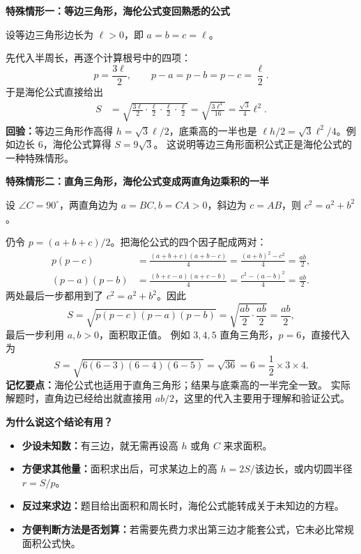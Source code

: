 \begin{explanationbox}
\medskip
\par\noindent\begin{minipage}{\linewidth}
\textbf{\textcolor{CExplanation}{特殊情形一：等边三角形，海伦公式变回熟悉的公式}}

设等边三角形边长为 $\ell>0$，即 $a=b=c=\ell$。
\end{minipage}\par
先代入半周长，再逐个计算根号中的四项：
\[
 p=\frac{3\ell}{2},\qquad
 p-a=p-b=p-c=\frac\ell2.
\]
于是海伦公式直接给出
\[
 \begin{aligned}
 S&=\sqrt{\frac{3\ell}{2}\cdot\frac\ell2\cdot\frac\ell2\cdot\frac\ell2}
   =\sqrt{\frac{3\ell^4}{16}}
   =\boxed{\frac{\sqrt3}{4}\ell^2}.
 \end{aligned}
\]
\textbf{回验：}等边三角形作高得 $h=\sqrt3\ell/2$，底乘高的一半也是
$\ell h/2=\sqrt3\ell^2/4$。例如边长 $6$，海伦公式算得 $S=9\sqrt3$。
这说明等边三角形面积公式正是海伦公式的一种特殊情形。

\medskip
\par\noindent\begin{minipage}{\linewidth}
\textbf{\textcolor{CExplanation}{特殊情形二：直角三角形，海伦公式变成两直角边乘积的一半}}

设 $\angle C=90^\circ$，两直角边为 $a=BC,b=CA>0$，斜边为 $c=AB$，则 $c^2=a^2+b^2$。
\end{minipage}\par
仍令 $p=(a+b+c)/2$。把海伦公式的四个因子配成两对：
\[
 \begin{aligned}
 p(p-c)&=\frac{(a+b+c)(a+b-c)}4
 =\frac{(a+b)^2-c^2}{4}=\frac{ab}{2},\\
 (p-a)(p-b)&=\frac{(b+c-a)(a+c-b)}4
 =\frac{c^2-(a-b)^2}{4}=\frac{ab}{2}.
 \end{aligned}
\]
两处最后一步都用到了 $c^2=a^2+b^2$。因此
\[
 S=\sqrt{p(p-c)(p-a)(p-b)}
   =\sqrt{\frac{ab}{2}\cdot\frac{ab}{2}}
   =\boxed{\frac{ab}{2}},
\]
最后一步利用 $a,b>0$，面积取正值。
例如 $3,4,5$ 直角三角形，$p=6$，直接代入为
\[
 S=\sqrt{6(6-3)(6-4)(6-5)}=\sqrt{36}=6
  =\frac12\times3\times4.
\]
\textbf{记忆要点：}海伦公式也适用于直角三角形；结果与底乘高的一半完全一致。
实际解题时，直角边已经给出就直接用 $ab/2$，这里的代入主要用于理解和验证公式。

	\textbf{\textcolor{CExplanation}{为什么说这个结论有用？}}
	\begin{itemize}[leftmargin=*,itemsep=0.35em]
		\item \textbf{少设未知数：}有三边，就无需再设高 $h$ 或角 $C$ 来求面积。
		\item \textbf{方便求其他量：}面积求出后，可求某边上的高 $h=2S/\text{该边长}$，或内切圆半径 $r=S/p$。
		\item \textbf{反过来求边：}题目给出面积和周长时，海伦公式能转成关于未知边的方程。
		\item \textbf{方便判断方法是否划算：}若需要先费力求出第三边才能套公式，它未必比常规面积公式快。
	\end{itemize}
\end{explanationbox}
